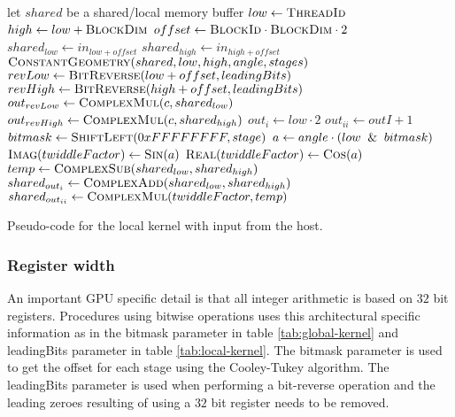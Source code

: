 \begin{algorithm}
	\centering
	\begin{algorithmic}[1]
            \State let $shared$ be a shared/local memory buffer     
            \State $low  \gets \Call{ThreadId}{}$
            \State $high \gets low + \Call{BlockDim}{}$   
            \State $offset \gets \Call{BlockId}{} \cdot \Call{BlockDim}{} \cdot 2$
			\newline
            \State $shared_{low}  \gets in_{low + offset}$
            \State $shared_{high} \gets in_{high + offset}$
            \State $\Call{ConstantGeometry}{shared, low, high, angle, stages}$
            \newline
            \State $revLow  \gets \Call{BitReverse}{low + offset, leadingBits}$
            \State $revHigh \gets \Call{BitReverse}{high + offset, leadingBits}$
            \State $out_{revLow}  \gets \Call{ComplexMul}{c, shared_{low}}$
            \State $out_{revHigh} \gets \Call{ComplexMul}{c, shared_{high}}$
        \EndProcedure
        \Statex
            \State $out_{i} \gets low \cdot 2$
            \State $out_{ii} \gets outI + 1$
	            \newline
            	\State $bitmask \gets \Call{ShiftLeft}{0xFFFFFFFF, stage}$
            	\State $a \gets angle \cdot (low \And bitmask)$
            	\State $\Call{Imag}{twiddleFactor} \gets \Call{Sin}{a}$
            	\State $\Call{Real}{twiddleFactor} \gets \Call{Cos}{a}$
            	\newline
				\State $temp \gets \Call{ComplexSub}{shared_{low}, shared_{high}}$
				\State $shared_{out_{i}} \gets \Call{ComplexAdd}{shared_{low}, shared_{high}}$
				\State $shared_{out_{ii}} \gets \Call{ComplexMul}{twiddleFactor, temp}$
			\EndFor
        \EndProcedure
	\end{algorithmic}
	\caption{Pseudo-code for the local kernel with input from the host.}
	\label{alg:device:local-kernel}
\end{algorithm}

\subsubsection{Register width}

An important GPU specific detail is that all integer arithmetic is based on $32$ bit registers. Procedures using bitwise operations uses this architectural specific information as in the bitmask parameter in table \ref{tab:global-kernel} and leadingBits parameter in table \ref{tab:local-kernel}. The bitmask parameter is used to get the offset for each stage using the Cooley-Tukey algorithm. The leadingBits parameter is used when performing a bit-reverse operation and the leading zeroes resulting of using a $32$ bit register needs to be removed.

